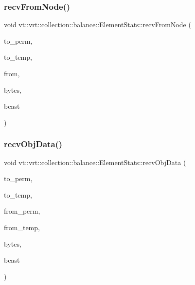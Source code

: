 \subsubsection{\texorpdfstring{recv\+From\+Node()}{recvFromNode()}}
{\footnotesize\ttfamily void vt\+::vrt\+::collection\+::balance\+::\+Element\+Stats\+::recv\+From\+Node (\begin{DoxyParamCaption}\item[{\hyperlink{namespacevt_1_1vrt_1_1collection_1_1balance_a14c8d2c972f2913aa3f1636e5be0a120}{Element\+I\+D\+Type}}]{to\+\_\+perm,  }\item[{\hyperlink{namespacevt_1_1vrt_1_1collection_1_1balance_a14c8d2c972f2913aa3f1636e5be0a120}{Element\+I\+D\+Type}}]{to\+\_\+temp,  }\item[{\hyperlink{namespacevt_a866da9d0efc19c0a1ce79e9e492f47e2}{Node\+Type}}]{from,  }\item[{double}]{bytes,  }\item[{bool}]{bcast }\end{DoxyParamCaption})}

\mbox{\label{structvt_1_1vrt_1_1collection_1_1balance_1_1_element_stats_afdd59d341ddd577a4652027b132a7c06}} 
\subsubsection{\texorpdfstring{recv\+Obj\+Data()}{recvObjData()}}
{\footnotesize\ttfamily void vt\+::vrt\+::collection\+::balance\+::\+Element\+Stats\+::recv\+Obj\+Data (\begin{DoxyParamCaption}\item[{\hyperlink{namespacevt_1_1vrt_1_1collection_1_1balance_a14c8d2c972f2913aa3f1636e5be0a120}{Element\+I\+D\+Type}}]{to\+\_\+perm,  }\item[{\hyperlink{namespacevt_1_1vrt_1_1collection_1_1balance_a14c8d2c972f2913aa3f1636e5be0a120}{Element\+I\+D\+Type}}]{to\+\_\+temp,  }\item[{\hyperlink{namespacevt_1_1vrt_1_1collection_1_1balance_a14c8d2c972f2913aa3f1636e5be0a120}{Element\+I\+D\+Type}}]{from\+\_\+perm,  }\item[{\hyperlink{namespacevt_1_1vrt_1_1collection_1_1balance_a14c8d2c972f2913aa3f1636e5be0a120}{Element\+I\+D\+Type}}]{from\+\_\+temp,  }\item[{double}]{bytes,  }\item[{bool}]{bcast }\end{DoxyParamCaption})}

